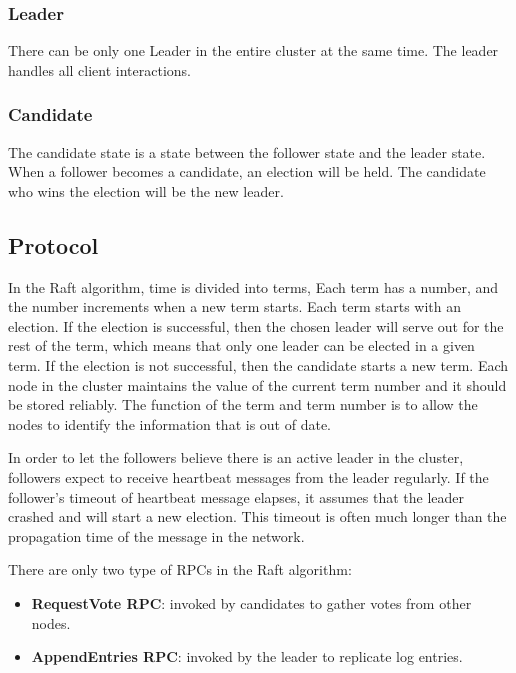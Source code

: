 \documentclass[12pt, a4paper]{article}
\begin{document}
  \subsubsection{Leader}
  There can be only one Leader in the entire cluster at the same time. The leader handles all client interactions.
  \subsubsection{Candidate}
  The candidate state is a state between the follower state and the leader state. When a follower becomes a candidate, an election
  will be held. The candidate who wins the election will be the new leader.
\subsection{Protocol}
In the Raft algorithm, time is divided into terms, Each term has a number, and the number increments when a new term starts. Each term starts
with an election. If the election is successful, then the chosen leader will serve out for the rest of the term, which means that
only one leader can be elected in a given term. If the election is not successful, then the candidate starts a new term. Each node
in the cluster maintains the value of the current term number and it should be stored reliably. The function of the term and term number is
to allow the nodes to identify the information that is out of date.
\par
In order to let the followers believe there is an active leader in the cluster, followers expect to receive heartbeat messages from
the leader regularly. If the follower's timeout of heartbeat message elapses, it assumes that the leader crashed and will start a
new election. This timeout is often much longer than the propagation time of the message in the network.
\par
There are only two type of RPCs in the Raft algorithm:
\begin{itemize}
  \item \textbf{RequestVote RPC}: invoked by candidates to gather votes from other nodes.
  \item \textbf{AppendEntries RPC}: invoked by the leader to replicate log entries.
\end{itemize}
\end{document}
